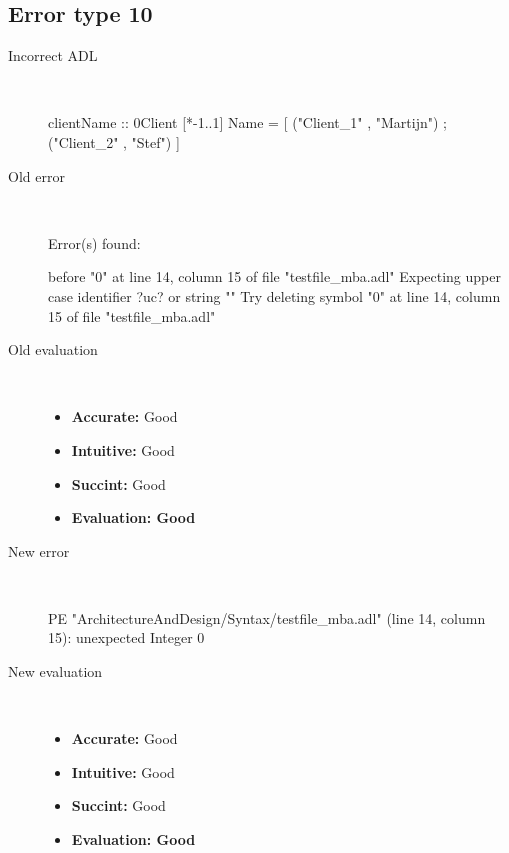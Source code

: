 \hrulefill

\subsection{Error type 10}
  \begin{description}
  \item[Incorrect ADL]~\\
\begin{adl}
clientName :: 0Client [*-1..1] Name =
    [ ("Client_1"      , "Martijn")
    ; ("Client_2"      , "Stef")
    ]\end{adl}
  \item[Old error]~\\
\begin{haskell}
Error(s) found:

before "0" at line 14, column 15 of file "testfile_mba.adl"
Expecting upper case identifier ?uc? or string ""
Try deleting symbol "0" at line 14, column 15 of file "testfile_mba.adl"\end{haskell}
  \item[Old evaluation]~\\
    \begin{itemize}
    \item \textbf{Accurate:} Good
    \item \textbf{Intuitive:} Good
    \item \textbf{Succint:} Good
    \item \textbf{Evaluation: Good}
    \end{itemize}
  \item[New error]~\\
\begin{haskell}
PE "ArchitectureAndDesign/Syntax/testfile_mba.adl" (line 14, column 15):
unexpected Integer 0\end{haskell}
  \item[New evaluation]~\\
    \begin{itemize}
    \item \textbf{Accurate:} Good
    \item \textbf{Intuitive:} Good
    \item \textbf{Succint:} Good
    \item \textbf{Evaluation: Good
}
    \end{itemize}
  \end{description}

\hrulefill


